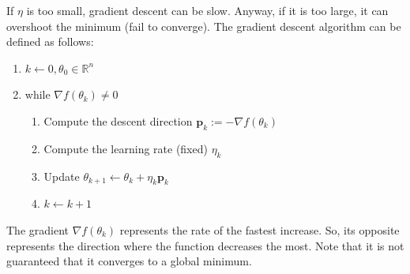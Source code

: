 If $\eta$ is too small, gradient descent can be slow. Anyway, if it is too large, it can overshoot the minimum (fail to converge).\newline\newline
The gradient descent algorithm can be defined as follows:
\begin{enumerate}
    \item $k \leftarrow 0, \theta_{0} \in \mathbb{R}^{n}$
    \item while $\nabla f(\theta_{k}) \neq 0$
    \begin{enumerate}
        \item Compute the descent direction $\textbf{p}_{k} := -\nabla f(\theta_{k})$

        \item Compute the learning rate (fixed) $\eta_{k}$

        \item Update $\theta_{k+1} \leftarrow \theta_{k} + \eta_{k}\textbf{p}_{k}$

        \item $k \leftarrow k + 1$
    \end{enumerate}
\end{enumerate}
The gradient $\nabla f(\theta_{k})$ represents the rate of the fastest increase. So, its opposite represents the direction where the function decreases the most. Note that it is not guaranteed that it converges to a global minimum.
